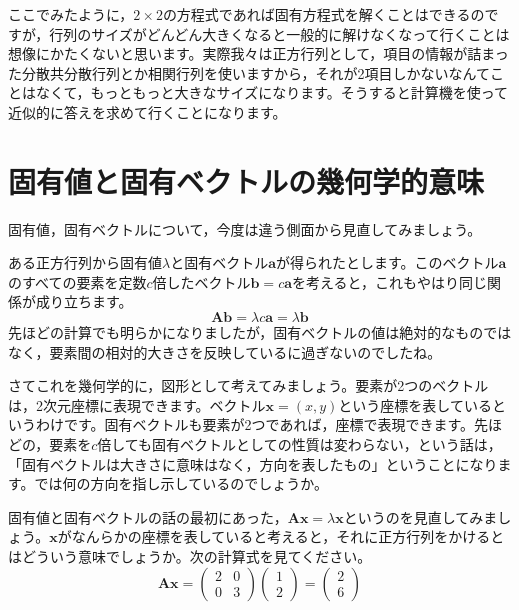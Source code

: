 \documentclass{ltjsbook}
\begin{document}
ここでみたように，$2\times2$の方程式であれば固有方程式を解くことはできるのですが，行列のサイズがどんどん大きくなると一般的に解けなくなって行くことは想像にかたくないと思います。実際我々は正方行列として，項目の情報が詰まった分散共分散行列とか相関行列を使いますから，それが2項目しかないなんてことはなくて，もっともっと大きなサイズになります。そうすると計算機を使って近似的に答えを求めて行くことになります。

\section{固有値と固有ベクトルの幾何学的意味}

固有値，固有ベクトルについて，今度は違う側面から見直してみましょう。

ある正方行列から固有値$\lambda$と固有ベクトル$\bm{a}$が得られたとします。このベクトル$\bm{a}$のすべての要素を定数$c$倍したベクトル$\bm{b}=c\bm{a}$を考えると，これもやはり同じ関係が成り立ちます。
\begin{equation}
    \bm{A}\bm{b}=  \lambda c \bm{a} =\lambda \bm{b}
\end{equation}
先ほどの計算でも明らかになりましたが，固有ベクトルの値は絶対的なものではなく，要素間の相対的大きさを反映しているに過ぎないのでしたね。

さてこれを幾何学的に，図形として考えてみましょう。要素が2つのベクトルは，2次元座標に表現できます。ベクトル$\bm{x}=(x,y)$という座標を表しているというわけです。固有ベクトルも要素が2つであれば，座標で表現できます。先ほどの，要素を$c$倍しても固有ベクトルとしての性質は変わらない，という話は，「固有ベクトルは大きさに意味はなく，方向を表したもの」ということになります。では何の方向を指し示しているのでしょうか。

固有値と固有ベクトルの話の最初にあった，$\bm{Ax}=\lambda\bm{x}$というのを見直してみましょう。$\bm{x}$がなんらかの座標を表していると考えると，それに正方行列をかけるとはどういう意味でしょうか。次の計算式を見てください。
\begin{equation}
    \bm{Ax}=
    \begin{pmatrix}
        2 & 0 \\
        0 & 3
    \end{pmatrix}
    \begin{pmatrix}
        1 \\
        2
    \end{pmatrix}
    =
    \begin{pmatrix}
        2 \\
        6
    \end{pmatrix}
\end{equation}
\end{document}
